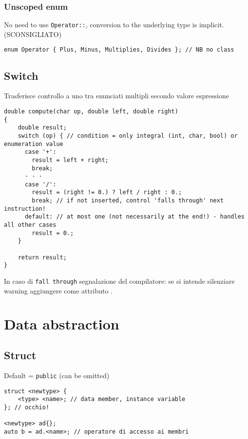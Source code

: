 \documentclass[10pt, oneside]{Book}
\begin{document}
\subsection{Unscoped enum}
No need to use \texttt{Operator::}, conversion to the underlying type is implicit. (SCONSIGLIATO)
\begin{verbatim}
enum Operator { Plus, Minus, Multiplies, Divides }; // NB no class
\end{verbatim}

\section{Switch}
Trasferisce controllo a uno tra enunciati multipli secondo valore espressione
\begin{verbatim}
double compute(char op, double left, double right)
{
    double result;
    switch (op) { // condition = only integral (int, char, bool) or enumeration value
      case '+':
        result = left + right;
        break;
      · · ·
      case '/':
        result = (right != 0.) ? left / right : 0.;
        break; // if not inserted, control 'falls through' next instruction!
      default: // at most one (not necessarily at the end!) - handles all other cases
        result = 0.;
    }
    
    return result;
}
\end{verbatim}
In caso di \texttt{fall through} segnalazione del compilatore: se si intende silenziare warning aggiungere come attributo \boxed{\texttt{[[fallthrough]]}}.

\chapter{Data abstraction}
\section{Struct}
Default = \texttt{public} (can be omitted)
\begin{verbatim}
struct <newtype> {
    <type> <name>; // data member, instance variable
}; // occhio!

<newtype> ad{};
auto b = ad.<name>; // operatore di accesso ai membri
\end{verbatim}
\end{document}
